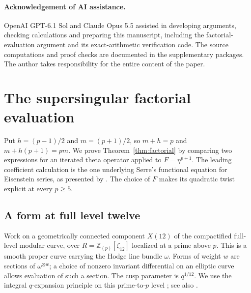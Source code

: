 \documentclass[11pt,a4paper]{article}
\numberwithin{equation}{section}
\theoremstyle{definition}
\theoremstyle{remark}
\newcommand{\Z}{\mathbb Z}
\begin{document}
\paragraph{Acknowledgement of AI assistance.}
OpenAI GPT-6.1 Sol and Claude Opus 5.5 assisted in developing arguments, checking 
calculations and preparing this manuscript, including the factorial-evaluation 
argument and its exact-arithmetic verification code. The source computations
and proof checks are documented in the supplementary packages.
The author takes responsibility for the entire content of the paper.

\section{The supersingular factorial evaluation}\label{sec:factorial}
Put $h=(p-1)/2$ and $m=(p+1)/2$, so $m+h=p$ and
$m+h(p+1)=pm$. We prove Theorem~\ref{thm:factorial} by comparing two
expressions for an iterated theta operator applied to $F=\eta^{p+1}$.
The leading coefficient calculation is the one underlying Serre's
functional equation for Eisenstein series, as presented by
\citet[\S2.5, Th\'eor\`eme~2, p.~119]{Robert80}. The choice of $F$ makes
its quadratic twist explicit at every $p\ge5$.

\subsection{A form at full level twelve}
Work on a geometrically connected component $X(12)$ of the compactified
full-level modular curve, over $R=\Z_{(p)}[\zeta_{12}]$ localized at a
prime above $p$. This is a smooth proper curve carrying the Hodge line
bundle $\omega$. Forms of weight $w$ are sections of $\omega^{\otimes w}$;
a choice of nonzero invariant differential on an elliptic curve allows
evaluation of such a section. The cusp parameter is $q^{1/12}$.
We use the integral $q$-expansion principle on this prime-to-$p$ level
\citep[\S1.6]{Katz73}; see also \citealp{DR73}.
\end{document}
